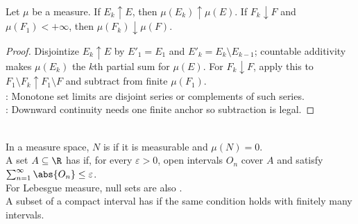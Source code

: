 \begin{corollary} \label{cor:measure-continuity-up-down} \\
Let $\mu$ be a measure. If $E_k\uparrow E$, then $\mu(E_k)\uparrow\mu(E)$. If $F_k\downarrow F$ and $\mu(F_1)<+\infty$, then $\mu(F_k)\downarrow\mu(F)$.
\begin{proof}
Disjointize $E_k\uparrow E$ by $E'_1=E_1$ and $E'_k=E_k\setminus E_{k-1}$; countable additivity makes $\mu(E_k)$ the $k$th partial sum for $\mu(E)$. For $F_k\downarrow F$, apply this to $F_1\setminus F_k\uparrow F_1\setminus F$ and subtract from finite $\mu(F_1)$.\\
: Monotone set limits are disjoint series or complements of such series.\\
: Downward continuity needs one finite anchor so subtraction is legal.
\end{proof}
\end{corollary}

\begin{definition} \label{def:null-sets-and-real-line-measure-zero} \\
In a measure space, $N$ is  if it is measurable and $\mu(N)=0$.\\
A set $A\subseteq\R$ has  if, for every $\varepsilon>0$, open intervals $O_n$ cover $A$ and satisfy $\sum_{n=1}^{\infty}\abs{O_n}\leq\varepsilon$.\\
For Lebesgue measure, null sets are also .\\
A subset of a compact interval has  if the same condition holds with finitely many intervals.
\end{definition}

